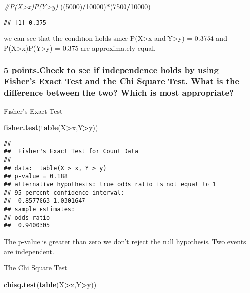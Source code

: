 \documentclass[]{article}
\newenvironment{Shaded}{\begin{snugshade}}{\end{snugshade}}
\newcommand{\KeywordTok}[1]{\textcolor[rgb]{0.13,0.29,0.53}{\textbf{#1}}}
\newcommand{\DecValTok}[1]{\textcolor[rgb]{0.00,0.00,0.81}{#1}}
\newcommand{\CommentTok}[1]{\textcolor[rgb]{0.56,0.35,0.01}{\textit{#1}}}
\newcommand{\OperatorTok}[1]{\textcolor[rgb]{0.81,0.36,0.00}{\textbf{#1}}}
\newcommand{\NormalTok}[1]{#1}
\begin{document}
\begin{Shaded}
\begin{Highlighting}[]
\CommentTok{#P(X>x)P(Y>y)}
\NormalTok{((}\DecValTok{5000}\NormalTok{)}\OperatorTok{/}\DecValTok{10000}\NormalTok{)}\OperatorTok{*}\NormalTok{(}\DecValTok{7500}\OperatorTok{/}\DecValTok{10000}\NormalTok{)}
\end{Highlighting}
\end{Shaded}

\begin{verbatim}
## [1] 0.375
\end{verbatim}

we can see that the condition holds since P(X\textgreater{}x and
Y\textgreater{}y) = 0.3754 and P(X\textgreater{}x)P(Y\textgreater{}y) =
0.375 are approximately equal.

\subsubsection{5 points.Check to see if independence holds by using
Fisher's Exact Test and the Chi Square Test. What is the difference
between the two? Which is most
appropriate?}\label{points.check-to-see-if-independence-holds-by-using-fishers-exact-test-and-the-chi-square-test.-what-is-the-difference-between-the-two-which-is-most-appropriate}

Fisher's Exact Test

\begin{Shaded}
\begin{Highlighting}[]
\KeywordTok{fisher.test}\NormalTok{(}\KeywordTok{table}\NormalTok{(X}\OperatorTok{>}\NormalTok{x,Y}\OperatorTok{>}\NormalTok{y))}
\end{Highlighting}
\end{Shaded}

\begin{verbatim}
## 
##  Fisher's Exact Test for Count Data
## 
## data:  table(X > x, Y > y)
## p-value = 0.188
## alternative hypothesis: true odds ratio is not equal to 1
## 95 percent confidence interval:
##  0.8577063 1.0301647
## sample estimates:
## odds ratio 
##  0.9400305
\end{verbatim}

The p-value is greater than zero we don't reject the null hypothesis.
Two events are independent.

The Chi Square Test

\begin{Shaded}
\begin{Highlighting}[]
\KeywordTok{chisq.test}\NormalTok{(}\KeywordTok{table}\NormalTok{(X}\OperatorTok{>}\NormalTok{x,Y}\OperatorTok{>}\NormalTok{y))}
\end{Highlighting}
\end{Shaded}
\end{document}
